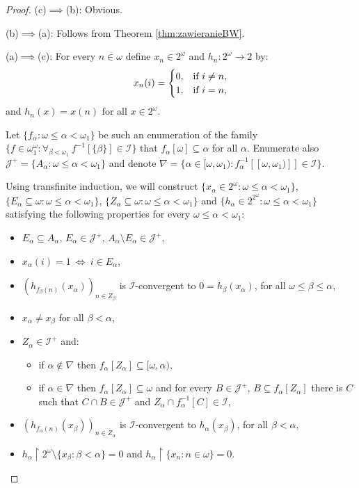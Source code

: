 \documentclass{amsart}
\theoremstyle{plain}
\theoremstyle{definition}
\theoremstyle{remark}
\newcommand{\cI}{\mathcal{I}}
\newcommand{\I}{\cI}
\newcommand{\cJ}{\mathcal{J}}
\newcommand{\J}{\cJ}
\begin{document}
\begin{proof}
(c)$\implies$(b): Obvious.

\medskip

(b)$\implies$(a): Follows from Theorem \ref{thm:zawieranieBW}.

\medskip

(a)$\implies$(c): For every $n\in\omega$ define $x_n\in 2^\omega$ and $h_n:2^\omega\to 2$ by:
\[
x_n(i)=\begin{cases}
0, & \text{if }i\neq n,\cr
1, & \text{if }i=n,
\end{cases}
\]
and $h_n(x)=x(n)$ for all $x\in 2^\omega$.

Let $\{f_\alpha: \omega\leq\alpha<\omega_1\}$ be such an enumeration of the family $\{f\in\omega^\omega_1: \forall_{\beta<\omega_1}\ f^{-1}[\{\beta\}]\in\I\}$ that $f_\alpha[\omega]\subseteq\alpha$ for all $\alpha$. Enumerate also $\J^+=\{A_\alpha: \omega\leq\alpha<\omega_1\}$ and denote $\nabla=\{\alpha\in[\omega,\omega_1):f_\alpha^{-1}[[\omega,\omega_1)]]\in\I\}$.

Using transfinite induction, we will construct $\{x_\alpha\in 2^\omega: \omega\leq\alpha<\omega_1\}$, $\{E_\alpha\subseteq\omega: \omega\leq\alpha<\omega_1\}$, $\{Z_\alpha\subseteq\omega: \omega\leq\alpha<\omega_1\}$ and $\{h_\alpha\in 2^{2^\omega}: \omega\leq\alpha<\omega_1\}$ satisfying the following properties for every $\omega\leq\alpha<\omega_1$: 
\begin{itemize}
    \item[(P1)] $E_\alpha\subseteq A_\alpha$, $E_\alpha\in\J^+$, $A_\alpha\setminus E_\alpha\in \J^+$,
    \item[(P2)] $x_\alpha(i)=1\ \iff\ i\in E_\alpha$,
    \item[(P3)] $(h_{f_\beta(n)}(x_\alpha))_{n\in Z_\beta}$ is $\I$-convergent to $0=h_\beta(x_\alpha)$, for all $\omega\leq\beta\leq\alpha$,
    \item[(P4)] $x_\alpha\neq x_\beta$ for all $\beta<\alpha$,
    \item[(P5)] $Z_\alpha\in\I^+$ and:
    \begin{itemize}
        \item if $\alpha\notin\nabla$ then $f_\alpha[Z_\alpha]\subseteq[\omega,\alpha)$,
        \item if $\alpha\in\nabla$ then $f_\alpha[Z_\alpha]\subseteq\omega$ and for every $B\in\J^+$, $B\subseteq f_\alpha[Z_\alpha]$ there is $C$ such that $C\cap B\in\J^+$ and $Z_\alpha\cap f_\alpha^{-1}[C]\in\I$,
    \end{itemize}
    \item[(P6)] $(h_{f_\alpha(n)}(x_\beta))_{n\in Z_\alpha}$ is $\I$-convergent to $h_\alpha(x_\beta)$, for all $\beta<\alpha$,
    \item[(P7)] $h_\alpha\restriction 2^\omega\setminus\{x_\beta: \beta<\alpha\}=0$ and $h_\alpha\restriction \{x_n: n\in\omega\}=0$.
\end{itemize}


\end{proof}
\end{document}

